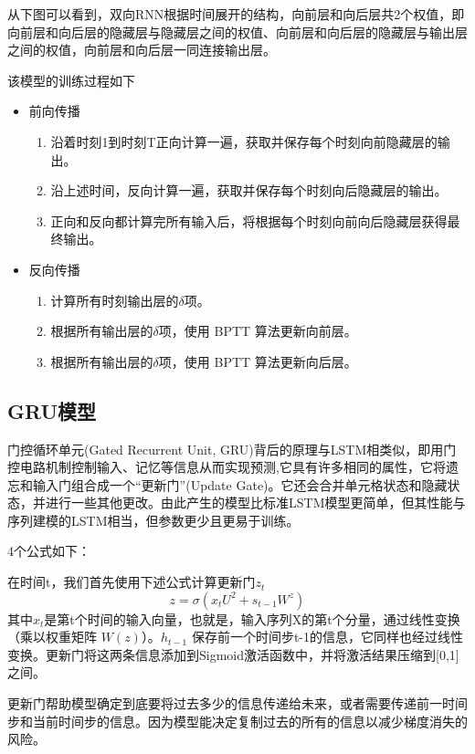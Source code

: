 \documentclass[a4paper,AutoFakeBold,oneside,12pt]{book}
\begin{document}
从下图可以看到，双向RNN根据时间展开的结构，向前层和向后层共2个权值，即向前层和向后层的隐藏层与隐藏层之间的权值、向前层和向后层的隐藏层与输出层之间的权值，向前层和向后层一同连接输出层。

该模型的训练过程如下
\begin{itemize}
    \item 前向传播
    \begin{enumerate}
        \item 沿着时刻1到时刻T正向计算一遍，获取并保存每个时刻向前隐藏层的输出。
        \item 沿上述时间，反向计算一遍，获取并保存每个时刻向后隐藏层的输出。
        \item 正向和反向都计算完所有输入后，将根据每个时刻向前向后隐藏层获得最终输出。
    \end{enumerate}
    \item 反向传播
    \begin{enumerate}
        \item 计算所有时刻输出层的$\delta$项。
        \item 根据所有输出层的$\delta$项，使用 BPTT 算法更新向前层。
        \item 根据所有输出层的$\delta$项，使用 BPTT 算法更新向后层。
    \end{enumerate}
\end{itemize}

\subsection{GRU模型}
门控循环单元(Gated Recurrent Unit, GRU)背后的原理与LSTM相类似，即用门控电路机制控制输入、记忆等信息从而实现预测,它具有许多相同的属性，它将遗忘和输入门组合成一个“更新门”(Update Gate)。它还会合并单元格状态和隐藏状态，并进行一些其他更改。由此产生的模型比标准LSTM模型更简单，但其性能与序列建模的LSTM相当，但参数更少且更易于训练\cite{chungEmpiricalEvaluationGated2014}。


4个公式如下：

在时间t，我们首先使用下述公式计算更新门$z_t$
$$ z = \sigma(x_t{U^2}+s_{t-1}W^{z}) $$
其中$x_t$是第t个时间的输入向量，也就是，输入序列X的第t个分量，通过线性变换（乘以权重矩阵 $W(z)$）。$h_{t-1}$ 保存前一个时间步t-1的信息，它同样也经过线性变换。更新门将这两条信息添加到Sigmoid激活函数中，并将激活结果压缩到[0,1]之间。

更新门帮助模型确定到底要将过去多少的信息传递给未来，或者需要传递前一时间步和当前时间步的信息。因为模型能决定复制过去的所有的信息以减少梯度消失的风险。
\end{document}
